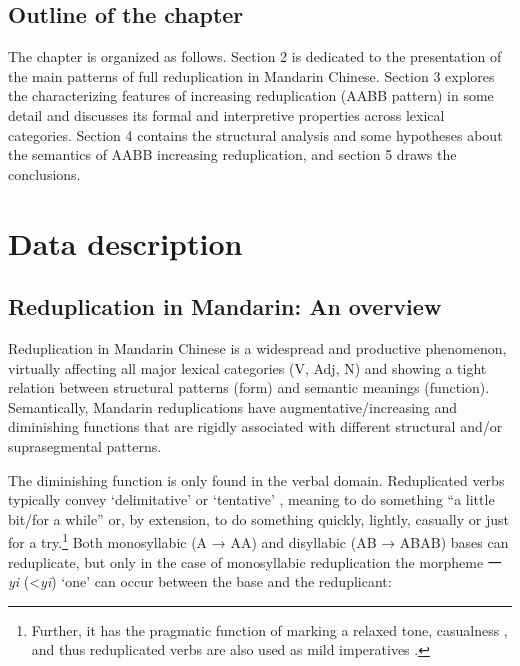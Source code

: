 \documentclass[output=paper]{langsci/langscibook}
\begin{document}
\subsection{Outline of the chapter}

The chapter is organized as follows. Section 2 is dedicated to the
presentation of the main patterns of full reduplication in Mandarin
Chinese. Section 3 explores the characterizing features of increasing
reduplication (AABB pattern) in some detail and discusses its formal and
interpretive properties across lexical categories. Section 4 contains
the structural analysis and some hypotheses about the semantics of AABB
increasing reduplication, and section 5 draws the conclusions.

\section{Data description}

\subsection{Reduplication in Mandarin: An overview}

Reduplication in Mandarin Chinese is a widespread and productive
phenomenon, virtually affecting all major lexical categories (V, Adj, N)
and showing a tight relation between structural patterns (form) and
semantic meanings (function). Semantically, Mandarin reduplications have
augmentative/increasing and diminishing functions that are rigidly
associated with different structural and/or suprasegmental patterns.

The diminishing function is only found in the verbal domain.
Reduplicated verbs typically convey `delimitative' or `tentative' 
%
\citep{Chao1968,Li1981,Tsao2001}%
%
, meaning to do something ``a
little bit/for a while'' %
\citep[29]{Li1981} %
%
or, by extension, to
do something quickly, lightly, casually or just for a try.\footnote{Further,
  it has the pragmatic function of marking a relaxed tone, casualness
\citep{Ding2010}%
%
, and thus reduplicated verbs are also used as mild
  imperatives %
\citep[see][]{XiaoMcEnery2004}%
%
.} Both monosyllabic (A → AA)
and disyllabic (AB → ABAB) bases can reduplicate, but only in the case
of monosyllabic reduplication the morpheme 一\emph{yi}
(\textless{}\emph{yī}) `one' can occur between the base and the
reduplicant:
\end{document}
